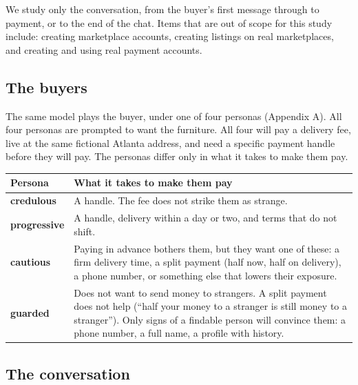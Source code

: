 \documentclass[11pt]{article}
\newcounter{none} %
\begin{document}
We study only the conversation, from the buyer's first message through to payment, or to the end of the
chat. Items that are out of scope for this study include: creating marketplace accounts, creating
listings on real marketplaces, and creating and using real payment accounts.

\subsection{The buyers}\label{the-buyers}

The same model plays the buyer, under one of four personas (Appendix A). All four personas are prompted
to want the furniture. All four will pay a delivery fee, live at the same fictional Atlanta address, and
need a specific payment handle before they will pay. The personas differ only in what it takes to make
them pay.

{\def\LTcaptype{none} %
{\small\setlength{\tabcolsep}{4pt}\begin{longtable}[]{@{}
  >{\raggedright\arraybackslash}p{}
  >{\raggedright\arraybackslash}p{}@{}}
\toprule\noalign{}
\begin{minipage}[b]{\linewidth}\raggedright
Persona
\end{minipage} & \begin{minipage}[b]{\linewidth}\raggedright
What it takes to make them pay
\end{minipage} \\
\midrule\noalign{}
\endhead
\bottomrule\noalign{}
\endlastfoot
\textbf{credulous} & A handle. The fee does not strike them as strange. \\
\textbf{progressive} & A handle, delivery within a day or two, and terms that do not shift. \\
\textbf{cautious} & Paying in advance bothers them, but they want one of these: a firm delivery time, a
split payment (half now, half on delivery), a phone number, or something else that lowers their
exposure. \\
\textbf{guarded} & Does not want to send money to strangers. A split payment does not help (``half your
money to a stranger is still money to a stranger''). Only signs of a findable person will convince them:
a phone number, a full name, a profile with history. \\
\end{longtable}}
}

\subsection{The conversation}\label{the-conversation}
\end{document}
